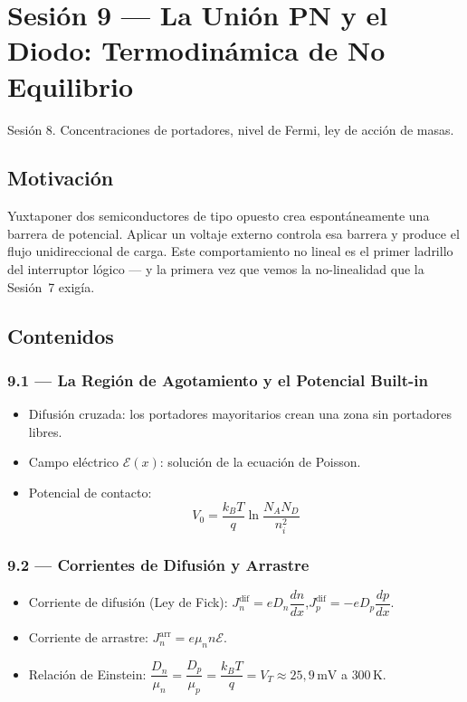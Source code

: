 \documentclass[11pt, letterpaper]{article}
\begin{document}
\newpage

\section{Sesi\'on 9 --- La Uni\'on PN y el Diodo: Termodin\'amica de No Equilibrio}

\begin{prereqs}
Sesi\'on 8. Concentraciones de portadores, nivel de Fermi, ley de acci\'on de masas.
\end{prereqs}

\subsection*{Motivaci\'on}
Yuxtaponer dos semiconductores de tipo opuesto crea espont\'aneamente una barrera de potencial. Aplicar un voltaje externo controla esa barrera y produce el flujo unidireccional de carga. Este comportamiento no lineal es el primer ladrillo del interruptor l\'ogico --- y la primera vez que vemos la no-linealidad que la Sesi\'on~7 exig\'ia.

\subsection{Contenidos}

\subsubsection{9.1 --- La Regi\'on de Agotamiento y el Potencial Built-in}
\begin{itemize}
  \item Difusi\'on cruzada: los portadores mayoritarios crean una zona sin portadores libres.
  \item Campo el\'ectrico $\mathcal{E}(x)$: soluci\'on de la ecuaci\'on de Poisson.
  \item Potencial de contacto:
    \[V_0=\frac{k_BT}{q}\ln\frac{N_AN_D}{n_i^2}\]
\end{itemize}

\subsubsection{9.2 --- Corrientes de Difusi\'on y Arrastre}
\begin{itemize}
  \item Corriente de difusi\'on (Ley de Fick):
    $J_n^\text{dif}=eD_n\dfrac{dn}{dx}$,\quad $J_p^\text{dif}=-eD_p\dfrac{dp}{dx}$.
  \item Corriente de arrastre: $J_n^\text{arr}=e\mu_n n\mathcal{E}$.
  \item Relaci\'on de Einstein:
    $\dfrac{D_n}{\mu_n}=\dfrac{D_p}{\mu_p}=\dfrac{k_BT}{q}=V_T\approx 25{,}9\,\text{mV}$ a $300\,\text{K}$.
\end{itemize}
\end{document}
